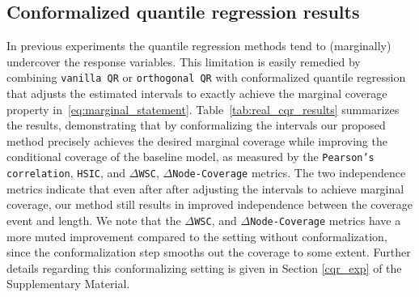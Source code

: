\documentclass{article}
\begin{document}
\subsection*{Conformalized quantile regression results}

In previous experiments the quantile regression methods tend to (marginally) undercover the response variables. This limitation is easily remedied by combining \texttt{vanilla QR} or \texttt{orthogonal QR} with conformalized quantile regression \cite{CQR} that adjusts the estimated intervals to exactly achieve the marginal coverage property in~\eqref{eq:marginal_statement}. Table~\ref{tab:real_cqr_results} summarizes the results, demonstrating that by conformalizing the intervals our proposed method precisely achieves the desired marginal coverage while improving the conditional coverage of the baseline model, as measured by the \texttt{Pearson's correlation}, \texttt{HSIC}, and $\Delta$\texttt{WSC}, \texttt{$\Delta$Node-Coverage} metrics.
The two independence metrics indicate that even after after adjusting the intervals to achieve marginal coverage, our method still results in improved independence between the coverage event and length. We note that the $\Delta$\texttt{WSC}, and \texttt{$\Delta$Node-Coverage} metrics have a more muted improvement compared to the setting without conformalization, since the conformalization step smooths out the coverage to some extent. 
Further details regarding this conformalizing setting is given in Section \ref{cqr_exp} of the Supplementary Material.
\end{document}
